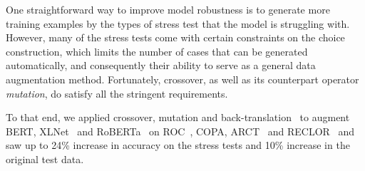 One straightforward way to improve model robustness is to generate more 
training examples by the types of stress test that the model is struggling with. 
However, many of the stress tests come with certain constraints on the choice
construction, which limits the number of cases that can be generated
automatically, and consequently their ability to serve as a general 
data augmentation method. 
Fortunately, crossover, as well as its counterpart operator \textit{mutation}, 
do satisfy all the stringent requirements. 

To that end, we applied crossover, mutation and back-translation~\cite{back2019} 
to augment BERT, XLNet~\cite{xlnet2019nips} and RoBERTa~\cite{roberta2019} on ROC~\cite{roc2017}, COPA, ARCT~\cite{arct2018} and RECLOR~\cite{yu2020reclor} and saw
up to 24\% increase in accuracy on the stress tests and 10\% increase in
the original test data.



